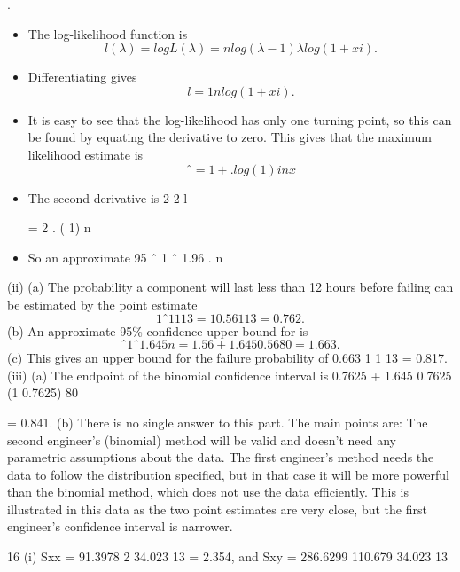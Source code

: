 \documentclass[a4paper,12pt]{article}
\begin{document}
 
 
.
\begin{itemize}
    \item The log-likelihood function is
\[l(\lambda) = log L(\lambda) = n log(\lambda -1)  \lambda log(1 + xi).\]
\item Differentiating gives
\[l

=
1
n
 
 log(1 + xi).\]
\item It is easy to see that the log-likelihood has only one turning point, so this
can be found by equating the derivative to zero. This gives that the
maximum likelihood estimate is
\[ˆ
= 1 + .
log(1 ) i
n
  x\]
\item The second derivative is
2
2
 l

= 2 .
( 1)
n
 
\item So an approximate 95%
ˆ 1
ˆ 1.96 .
n
 
\end{itemize}

 

(ii) (a) The probability a component will last less than 12 hours before
failing can be estimated by the point estimate
\[1  ˆ 1
1
13
= 1  0.56
1
13
= 0.762.\]
(b) An approximate 95\% confidence upper bound for  is
\[ ˆ 1
ˆ 1.645
n
 
  = 1.56 + 1.645
0.56
80
= 1.663.\]
(c) This gives an upper bound for the failure probability of
0.663
1
1
13
 = 0.817.
(iii) (a) The endpoint of the binomial confidence interval is
0.7625 + 1.645 
0.7625 (1 0.7625)
80
 
= 0.841.
(b) There is no single answer to this part. The main points are:
The second engineer’s (binomial) method will be valid and doesn’t
need any parametric assumptions about the data.
The first engineer’s method needs the data to follow the
distribution specified, but in that case it will be more powerful
than the binomial method, which does not use the data efficiently.
This is illustrated in this data as the two point estimates are very
close, but the first engineer’s confidence interval is narrower.

\newpage

16 (i) Sxx = 91.3978 
2 34.023
13
= 2.354, and
Sxy = 286.6299 
110.679 34.023
13
\end{document}
